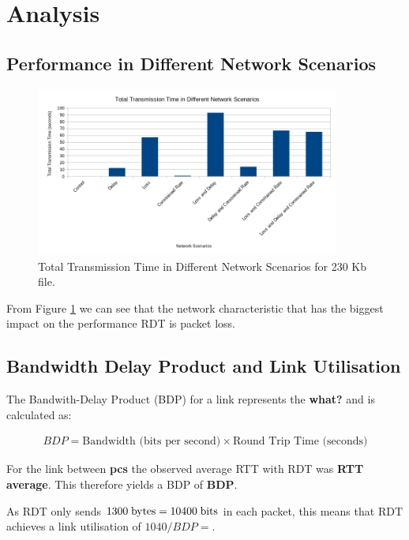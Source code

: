 \section{Analysis}

\subsection{Performance in Different Network Scenarios}
\label{sec:performance}

\begin{figure}[H]
\begin{center}
    \includegraphics[width=100mm]{images/performance-network-scenarios.png}
\end{center}
\caption{Total Transmission Time in Different Network Scenarios for 230 Kb file.}\label{fig:performance}
\end{figure}

From Figure \ref{fig:performance} we can see that the network characteristic that has the biggest impact on the performance RDT is packet loss. 

\subsection{Bandwidth Delay Product and Link Utilisation}

The Bandwith-Delay Product (BDP) for a link represents the \textbf{what?} and is calculated as:

\begin{align*}
    BDP = \text{Bandwidth (bits per second)} \times \text{Round Trip Time (seconds)}
\end{align*}

For the link between \textbf{pcs} the observed average RTT with RDT was \textbf{RTT average}. This therefore yields a BDP of \textbf{BDP}.

As RDT only sends $1300 \text{\;bytes} = 10400 \text{\;bits}$ in each packet, this means that RDT achieves a link utilisation of $1040 / BDP = $.

